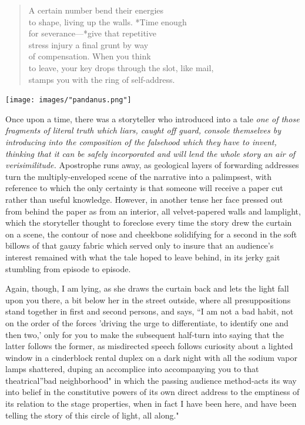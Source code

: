 \documentclass[
]{memoir}
\newlength{\drop}%
\begin{document}
\begin{verse}
A certain number bend their energies\\
to shape, living up the walls. *Time enough\\
for severance—*give that repetitive\\
stress injury a final grunt by way\\
of compensation. When you think\\
to leave, your key drops through the slot, like mail,\\
stamps you with the ring of self-address.\\
\end{verse}

\begin{center}\texttt{[image: images/"pandanus.png"]}\end{center}

Once upon a time, there was a storyteller who introduced into a tale
\emph{one of those fragments of literal truth which liars, caught off
guard, console themselves by introducing into the composition of the
falsehood which they have to invent, thinking that it can be safely
incorporated and will lend the whole story an air of verisimilitude.}
Apostrophe runs away, as geological layers of forwarding addresses turn
the multiply-enveloped scene of the narrative into a palimpsest, with
reference to which the only certainty is that someone will receive a
paper cut rather than useful knowledge. However, in another tense her
face pressed out from behind the paper as from an interior, all
velvet-papered walls and lamplight, which the storyteller thought to
foreclose every time the story drew the curtain on a scene, the contour
of nose and cheekbone solidifying for a second in the soft billows of
that gauzy fabric which served only to insure that an audience's
interest remained with what the tale hoped to leave behind, in its jerky
gait stumbling from episode to episode.

Again, though, I am lying, as she draws the curtain back and lets the
light fall upon you there, a bit below her in the street outside, where
all presuppositions stand together in first and second persons, and
says, ``I am not a bad habit, not on the order of the forces 'driving
the urge to differentiate, to identify one and then two,' only for you
to make the subsequent half-turn into saying that the latter follows the
former, as misdirected speech follows curiosity about a lighted window
in a cinderblock rental duplex on a dark night with all the sodium vapor
lamps shattered, duping an accomplice into accompanying you to that
theatrical''bad neighborhood" in which the passing audience method-acts
its way into belief in the constitutive powers of its own direct address
to the emptiness of its relation to the stage properties, when in fact I
have been here, and have been telling the story of this circle of light,
all along."
\end{document}
